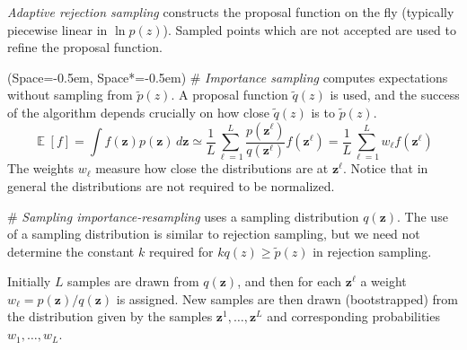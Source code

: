 \documentclass[12pt, a4paper]{article}
\newcommand{\listSpace}{-0.5em}%
\newcommand{\vect}[1]{\bm{#1}}
\DeclareMathOperator{\E}{\mathbb{E}}
\begin{document}
\begin{easylist}[itemize]
	\emph{Adaptive rejection sampling} constructs the proposal function on the fly (typically piecewise linear in $\ln p(z)$).
	Sampled points which are not accepted are used to refine the proposal function.
		
	\end{easylist}
		\begin{easylist}[itemize]
			\ListProperties(Space=\listSpace, Space*=\listSpace)
	# \emph{Importance sampling} computes expectations without sampling from $\widetilde{p}(z)$.
	A proposal function $\widetilde{q}(z)$ is used, and the success of the algorithm depends crucially on how close $\widetilde{q}(z)$ is to $\widetilde{p}(z)$.
	\begin{equation*}
		\E [f] = \int f(\vect{z}) p(\vect{z}) \, d \vect{z}
		\simeq \frac{1}{L} \sum_{\ell = 1}^{L} \frac{p(\vect{z}^\ell)}{q(\vect{z}^\ell)} f(\vect{z}^\ell)
		= \frac{1}{L} \sum_{\ell = 1}^{L} w_\ell f(\vect{z}^\ell)
	\end{equation*}
	The weights $w_\ell$ measure how close the distributions are at $\vect{z}^\ell$.
	Notice that in general the distributions are not required to be normalized.
	
	# \emph{Sampling importance-resampling} uses a sampling distribution $q(\vect{z})$.
	The use of a sampling distribution is similar to rejection sampling, but we need not determine the constant $k$ required for $kq(z) \geq \widetilde{p}(z)$ in rejection sampling.
	
	Initially $L$ samples are drawn from $q(\vect{z})$, and then for each $\vect{z}^\ell$ a weight $w_\ell = p(\vect{z})/q(\vect{z})$ is assigned.
	New samples are then drawn (bootstrapped) from the distribution given by the samples $\vect{z}^1, \ldots, \vect{z}^L$ and corresponding probabilities $w_1, \ldots, w_L$.
\end{easylist}
\end{document}
